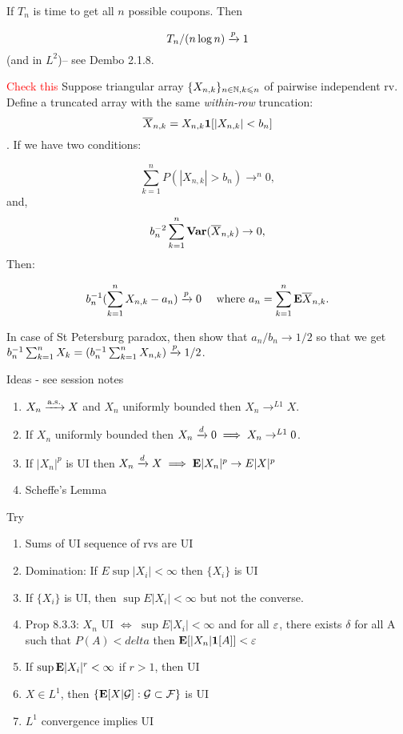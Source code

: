 \documentclass{article}
\newcommand\myworries[1]{\textcolor{red}{#1}}
\begin{document}
\begin{theorem}
If $T_n$ is time to get all $n$ possible coupons. Then 

$$T_n/(n\log n) \xrightarrow{p} 1$$ (and in $L^2$)-- see Dembo 2.1.8.
\end{theorem}

\begin{theorem}
\myworries{Check this}
Suppose triangular array $\{X_{n,k}\}_{{n\in \mathbb N, k\leqslant n}}$ of pairwise independent rv. Define a truncated array with the same \textit{within-row} truncation:
$$\overline X_{n,k} = X_{n,k} \boldsymbol{1}[|X_{n,k}| < b_n ]$$. If we have two conditions:

$$\sum_{k=1}^n P(|X_{n,k}|>b_n) \to^n 0,$$
and,
$$b_n^{-2} \sum_{k=1}^n \mathbf{Var} (\overline X_{n,k}) \to 0,$$
Then:

$$b_n^{-1} (\sum_{k=1}^n X_{n,k} - a_n) \xrightarrow{p} 0 \quad \text{ where } a_n = \sum_{k=1}^n \mathbf{E} \overline X_{n,k}.$$

In case of St Petersburg paradox, then show that $a_n/b_n \to 1/2$ so that we get $b_n^{-1} \sum_{k=1}^n X_k = (b_n^{-1} \sum_{k=1}^n X_{n,k}) \xrightarrow{p} 1/2 $. 



\end{theorem}
\begin{recipe}
Ideas - see session notes 
\begin{enumerate}
	\item $X_n \xrightarrow{\mathrm{a.s.}} X$ and $X_n$ uniformly bounded then $X_n \to^{L1} X$.
	\item If $X_n$ uniformly bounded then $X_n\xrightarrow{d} 0 \implies X_n \to^{L1} 0$.
	\item If $|X_n|^p$ is UI then $X_n \xrightarrow{d} X \implies \mathbf{E} |X_n|^p \to E|X|^p$ 
	\item Scheffe's Lemma 
\end{enumerate}
\end{recipe}

\begin{recipe}[Proving UI]
Try
\begin{enumerate}
	\item Sums of UI sequence of rvs are UI
	\item Domination: If $E\sup |X_i| < \infty$ then $\{X_i\}$ is UI
	\item If $\{X_i\}$ is UI, then $\sup E |X_i| <\infty$ but not the converse. 
	\item Prop 8.3.3: $X_n$ UI $\iff$ $\sup E|X_i| <\infty$ and for all $\varepsilon$, there exists $\delta$ for all A such that $P(A) <delta$ then $\mathbf{E}[|X_n| \boldsymbol{1}[A] ] <\varepsilon$
	\item If $\sup \mathbf{E} |X_i|^r <\infty$ if $r>1$, then UI 
	\item $X\in L^1$, then $\{\mathbf{E}[X|\mathcal G]: \mathcal G \subset \mathcal F\}$ is UI
	\item $L^1$ convergence implies UI
\end{enumerate}
\end{recipe}
\end{document}
